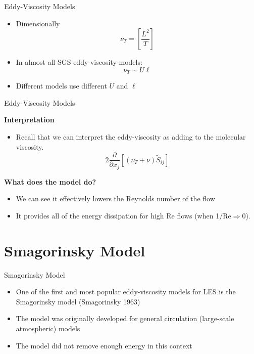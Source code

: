 \begin{frame}{Eddy-Viscosity Models}
\begin{itemize}
	\item Dimensionally
	$$\nu_T = \left[ \frac{L^2}{T}\right]$$
	\item In almost all SGS eddy-viscosity models:
	$$\nu_T \sim U\ell$$
	\item Different models use different $U$ and $\ell$
\end{itemize}

\end{frame}


\begin{frame}{Eddy-Viscosity Models}

\textbf{Interpretation}
\begin{itemize}
	\item Recall that we can interpret the eddy-viscosity as adding to the molecular viscosity.
	$$2\frac{\partial}{\partial x_j}\left[\left(\nu_T + \nu\right)\widetilde{S}_{ij}\right]$$	
\end{itemize}

\textbf{What does the model do?}
\begin{itemize}
	\item We can see it effectively lowers the Reynolds number of the flow
	\item It provides all of the energy dissipation for high Re flows (when 1/Re$\Rightarrow$0).
\end{itemize}
\end{frame}

\section{Smagorinsky Model} %
\begin{frame}{Smagorinsky Model}
\begin{itemize}
	\item One of the first and most popular eddy-viscosity models for LES is the Smagorinsky model (Smagorinsky 1963)
	\item The model was originally developed for general circulation (large-scale atmospheric) models
	\item The model did not remove enough energy in this context
\end{itemize}

\end{frame}

